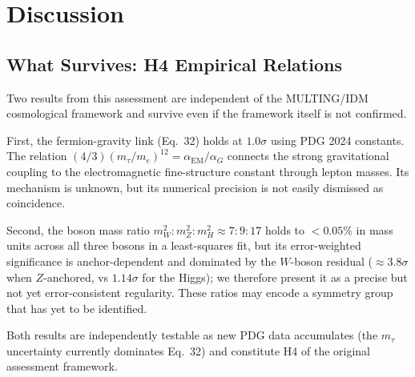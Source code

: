 \documentclass[twocolumn,prd,amsmath,amssymb,floatfix]{revtex4-2}
\begin{document}
\section{Discussion}
\label{sec:discuss}

\subsection{What Survives: H4 Empirical Relations}

Two results from this assessment are independent of the MULTING/IDM
cosmological framework and survive even if the framework itself is not
confirmed.

First, the fermion-gravity link (Eq.~32) holds at $1.0\sigma$ using PDG 2024
constants.  The relation $(4/3)(m_\tau/m_e)^{12} = \alpha_\mathrm{EM}/\alpha_G$
connects the strong gravitational coupling to the electromagnetic fine-structure
constant through lepton masses.  Its mechanism is unknown, but its numerical
precision is not easily dismissed as coincidence.

Second, the boson mass ratio $m_W^2:m_Z^2:m_H^2 \approx 7:9:17$ holds to
$<0.05\%$ in mass units across all three bosons in a least-squares fit, but
its error-weighted significance is anchor-dependent and dominated by the
$W$-boson residual ($\approx 3.8\sigma$ when $Z$-anchored, vs $1.14\sigma$ for
the Higgs); we therefore present it as a precise but not yet error-consistent
regularity. These ratios may encode a symmetry group that has yet to be identified.

Both results are independently testable as new PDG data accumulates (the
$m_\tau$ uncertainty currently dominates Eq.~32) and constitute H4 of the
original assessment framework.
\end{document}
